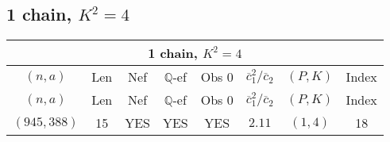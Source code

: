 \subsection{1 chain, $K^2 = 4$}
\begin{longtable}{|c|c|c|c|c|c|c|c|}
\hline
\multicolumn{8}{|c|}{1 chain, $K^2 = 4$}\\
\hline
$(n,a)$ & Len & Nef & $\mathbb Q$-ef & Obs 0 & $\overline c_1^2 / \overline c_2$ & $(P,K)$ & Index\\
\hline
\endfirsthead

\hline
$(n,a)$ & Len & Nef & $\mathbb Q$-ef & Obs 0 & $\overline c_1^2 / \overline c_2$ & $(P,K)$ & Index\\
\hline
\endhead
\hline
\endfoot

$(945,388)$ & 15 & YES & YES & YES & $2.11$ & $(1,4)$ & 18
\end{longtable}
